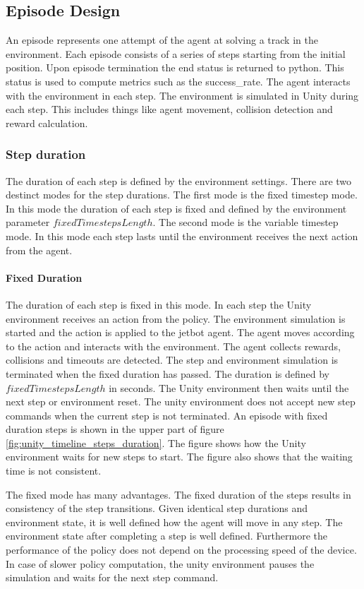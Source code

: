 \subsection{Episode Design}

An episode represents one attempt of the agent at solving a track in the environment. Each episode consists of a series of steps starting from the initial position. Upon episode termination the end status is returned to python. This status is used to compute metrics such as the success\_rate. The agent interacts with the environment in each step. The environment is simulated in Unity during each step. This includes things like agent movement, collision detection and reward calculation.

\subsubsection{Step duration}
The duration of each step is defined by the environment settings. There are two destinct modes for the step durations. The first mode is the fixed timestep mode. In this mode the duration of each step is fixed and defined by the environment parameter $fixedTimestepsLength$. The second mode is the variable timestep mode. In this mode each step lasts until the environment receives the next action from the agent.

\paragraph{Fixed Duration}

The duration of each step is fixed in this mode. In each step the Unity environment receives an action from the policy. The environment simulation is started and the action is applied to the jetbot agent. The agent moves according to the action and interacts with the environment. The agent collects rewards, collisions and timeouts are detected. The step and environment simulation is terminated when the fixed duration has passed. The duration is defined by $fixedTimestepsLength$ in seconds. The Unity environment then waits until the next step or environment reset. The unity environment does not accept new step commands when the current step is not terminated.
An episode with fixed duration steps is shown in the upper part of figure \ref{fig:unity_timeline_steps_duration}. The figure shows how the Unity environment waits for new steps to start. The figure also shows that the waiting time is not consistent.

The fixed mode has many advantages. The fixed duration of the steps results in consistency of the step transitions. Given identical step durations and environment state, it is well defined how the agent will move in any step. The environment state after completing a step is well defined.
Furthermore the performance of the policy does not depend on the processing speed of the device. In case of slower policy computation, the unity environment pauses the simulation and waits for the next step command.

